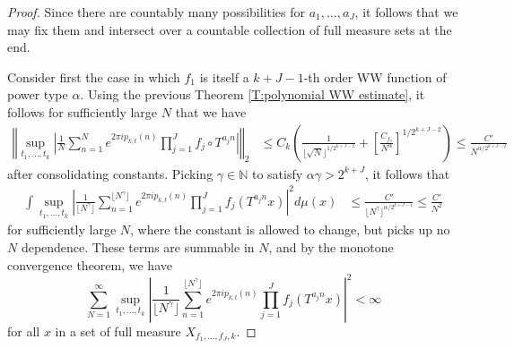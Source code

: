 \documentclass[10pt,a4paper]{amsart}
\newcommand{\N}{\mathbb{N}}
\newcommand{\floor}[1]{\lfloor#1\rfloor}
\begin{document}
\begin{proof}
Since there are countably many possibilities for $a_1, \dots, a_J$, it follows that we may fix them and intersect over a countable collection of full measure sets at the end.

Consider first the case in which $f_1$ is itself a $k+J-1$-th order WW function of power type $\alpha$. Using the previous Theorem \ref{T:polynomial WW estimate}, it follows for sufficiently large $N$ that we have
\begin{align*}
\left\Vert \sup_{t_1, \dots, t_k} \left|\frac{1}{N}\sum_{n=1}^N e^{2\pi i p_{k, t}(n)} \prod_{j=1}^J f_j \circ T^{a_j n} \right| \right\Vert_2 &\leq C_k\left(\frac{1}{\floor{\sqrt{N}}^{1/2^{k+J-2}}} + \left[\frac{C_{f_1}}{N^\alpha}\right]^{1/2^{k+J-2}}\right) \leq \frac{C'}{N^{\alpha / 2^{k + J - 2}}}
\end{align*}
after consolidating constants. Picking $\gamma \in \N$ to satisfy $\alpha \gamma > 2^{k + J}$, it follows that 
\begin{align*}
\int \sup_{t_1, \dots, t_k} \left|\frac{1}{\floor{N^\gamma}}\sum_{n=1}^{\floor{N^\gamma}} e^{2\pi i p_{k, t}(n)} \prod_{j=1}^J f_j (T^{a_j n} x) \right|^2 d\mu(x) &\leq \frac{C'}{\floor{N^\gamma}^{\alpha/2^{k+J-1}}} \leq \frac{C'}{N^2}
\end{align*}
for sufficiently large $N$, where the constant is allowed to change, but picks up no $N$ dependence. These terms are summable in $N$, and by the monotone convergence theorem, we have
$$\sum_{N=1}^\infty \sup_{t_1, \dots, t_k} \left|\frac{1}{\floor{N^\gamma}}\sum_{n=1}^{\floor{N^\gamma}} e^{2\pi i p_{k, t}(n)} \prod_{j=1}^J f_j (T^{a_j n} x) \right|^2 < \infty $$
for all $x$ in a set of full measure $X_{f_1, \dots, f_{J}, k}$.


\end{proof}
\end{document}
